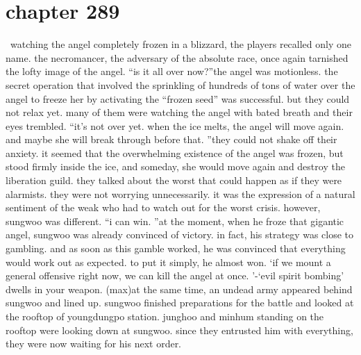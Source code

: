 \section{chapter 289}






 watching the angel completely frozen in a blizzard, the players recalled only one name.
 the necromancer, the adversary of the absolute race, once again tarnished the lofty image of the angel.
“is it all over now?”the angel was motionless.
 the secret operation that involved the sprinkling of hundreds of tons of water over the angel to freeze her by activating the “frozen seed” was successful.
but they could not relax yet.
 many of them were watching the angel with bated breath and their eyes trembled.
“it’s not over yet.
 when the ice melts, the angel will move again.
 and maybe she will break through before that.
”they could not shake off their anxiety.
 it seemed that the overwhelming existence of the angel was frozen, but stood firmly inside the ice, and someday, she would move again and destroy the liberation guild.
they talked about the worst that could happen as if they were alarmists.
 they were not worrying unnecessarily.
 it was the expression of a natural sentiment of the weak who had to watch out for the worst crisis.
however, sungwoo was different.
“i can win.
”at the moment, when he froze that gigantic angel, sungwoo was already convinced of victory.
in fact, his strategy was close to gambling.
 and as soon as this gamble worked, he was convinced that everything would work out as expected.
to put it simply, he almost won.
‘if we mount a general offensive right now, we can kill the angel at once.
’-‘evil spirit bombing’ dwells in your weapon.
 (max)at the same time, an undead army appeared behind sungwoo and lined up.
sungwoo finished preparations for the battle and looked at the rooftop of youngdungpo station.
junghoo and minhum standing on the rooftop were looking down at sungwoo.
 since they entrusted him with everything, they were now waiting for his next order.

